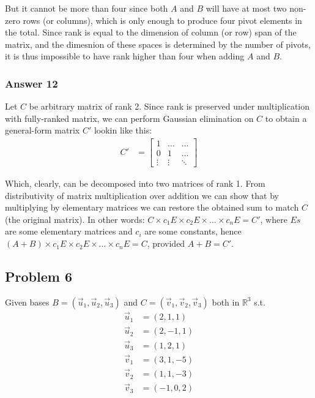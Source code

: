 \documentclass[11pt]{article}
\begin{document}
\begin{enumerate}
But it cannot be more than four since both $A$ and $B$ will have at most
two non-zero rows (or columns), which is only enough to produce four
pivot elements in the total.  Since rank is equal to the dimension of
column (or row) span of the matrix, and the dimesnion of these spaces is
determined by the number of pivots, it is thus impossible to have rank
higher than four when adding $A$ and $B$.
\end{enumerate}

\subsubsection{Answer 12}
\label{sec-1-5-3}
Let $C$ be arbitrary matrix of rank 2.  Since rank is preserved under
multiplication with fully-ranked matrix, we can perform Gaussian elimination
on $C$ to obtain a general-form matrix $C'$ lookin like this:
\begin{align*}
  C' &= \begin{bmatrix}
    1      & \dots  & \dots \\
    0      & 1      & \dots \\
    \vdots & \vdots & \ddots
  \end{bmatrix}
\end{align*}

Which, clearly, can be decomposed into two matrices of rank 1.  From
distributivity of matrix multiplication over addition we can show that by
multiplying by elementary matrices we can restore the obtained sum to match
$C$ (the original matrix).  In other words: $C \times c_1E \times c_2E
    \times \dots \times c_nE = C'$, where $Es$ are some elementary matrices and
$c_i$ are some constants, hence $(A + B) \times c_1E \times c_2E \times
    \dots \times c_nE = C$, provided $A + B = C'$.

\subsection{Problem 6}
\label{sec-1-6}
Given bases $B = (\vec{u}_1, \vec{u}_2, \vec{u}_3)$ and $C = (\vec{v}_1,
   \vec{v}_2, \vec{v}_3)$ both in $\mathbb{R}^3$ s.t.
\begin{align*}
  \vec{u}_1 &= (2,1,1) \\
  \vec{u}_2 &= (2,-1,1) \\
  \vec{u}_3 &= (1,2,1) \\
  \vec{v}_1 &= (3,1,-5) \\
  \vec{v}_2 &= (1,1,-3) \\
  \vec{v}_3 &= (-1,0,2)
\end{align*}
\end{document}
